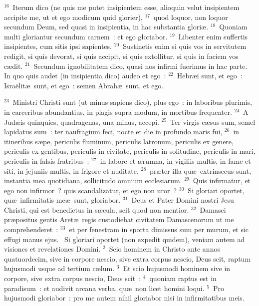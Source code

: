 ${}^{16}$~Iterum dico (ne quis me putet insipientem esse, alioquin velut insipientem accipite me, ut et ego modicum quid glorier),
${}^{17}$~quod loquor, non loquor secundum Deum, sed quasi in insipientia, in hac substantia glori\ae .
${}^{18}$~Quoniam multi gloriantur secundum carnem~: et ego gloriabor.
${}^{19}$~Libenter enim suffertis insipientes, cum sitis ipsi sapientes.
${}^{20}$~Sustinetis enim si quis vos in servitutem redigit, si quis devorat, si quis accipit, si quis extollitur, si quis in faciem vos c\ae dit.
${}^{21}$~Secundum ignobilitatem dico, quasi nos infirmi fuerimus in hac parte. In quo quis audet (in insipientia dico) audeo et ego~:
${}^{22}$~Hebr\ae i sunt, et ego~: Isra\"elit\ae\ sunt, et ego~: semen Abrah\ae\ sunt, et ego.


${}^{23}$~Ministri Christi sunt (ut minus sapiens dico), plus ego~: in laboribus plurimis, in carceribus abundantius, in plagis supra modum, in mortibus frequenter.
${}^{24}$~A Jud\ae is quinquies, quadragenas, una minus, accepi.
${}^{25}$~Ter virgis c\ae sus sum, semel lapidatus sum~: ter naufragium feci, nocte et die in profundo maris fui,
${}^{26}$~in itineribus s\ae pe, periculis fluminum, periculis latronum, periculis ex genere, periculis ex gentibus, periculis in civitate, periculis in solitudine, periculis in mari, periculis in falsis fratribus~:
${}^{27}$~in labore et \ae rumna, in vigiliis multis, in fame et siti, in jejuniis multis, in frigore et nuditate,
${}^{28}$~pr\ae ter illa qu\ae\ extrinsecus sunt, instantia mea quotidiana, sollicitudo omnium ecclesiarum.
${}^{29}$~Quis infirmatur, et ego non infirmor~? quis scandalizatur, et ego non uror~?
${}^{30}$~Si gloriari oportet, qu\ae\ infirmitatis me\ae\ sunt, gloriabor.
${}^{31}$~Deus et Pater Domini nostri Jesu Christi, qui est benedictus in s\ae cula, scit quod non mentior.
${}^{32}$~Damasci pr\ae positus gentis Aret\ae\ regis custodiebat civitatem Damascenorum ut me comprehenderet~:
${}^{33}$~et per fenestram in sporta dimissus sum per murum, et sic effugi manus ejus.
~\lettrine[lines=10,image=true,loversize=0.05,lraise=-0.03]{S}{}i gloriari oportet (non expedit quidem), veniam autem ad visiones et revelationes Domini.
${}^{2}$~Scio hominem in Christo ante annos quatuordecim, sive in corpore nescio, sive extra corpus nescio, Deus scit, raptum hujusmodi usque ad tertium c\ae lum.
${}^{3}$~Et scio hujusmodi hominem sive in corpore, sive extra corpus nescio, Deus scit~:
${}^{4}$~quoniam raptus est in paradisum~: et audivit arcana verba, qu\ae\ non licet homini loqui.
${}^{5}$~Pro hujusmodi gloriabor~: pro me autem nihil gloriabor nisi in infirmitatibus meis.
